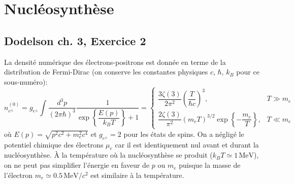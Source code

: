 \documentclass{article}
\numberwithin{equation}{section}
\begin{document}
\section{Nucléosynthèse}
\subsection{Dodelson ch. 3, Exercice 2}
La densité numérique des électrons-positrons est donnée en terme de la distribution 
de Fermi-Dirac (on conserve les constantes physiques $c,\, \hbar,\, k_B$ pour ce 
sous-numéro):
\begin{equation}\label{eq:nelectron} 
        n_{e^\pm}^{(0)} = g_{e^\pm}\int \frac{d^3p}{(2 \pi \hbar)^{3}} 
        \frac{1}{\exp \left\{ \dfrac{E(p)}{k_B T} \right\} + 1} 
        = \left\{ 
\begin{array}{ll}
        \dfrac{3 \zeta(3)}{2\pi^2}\left(\dfrac{T}{\hbar c}  \right)^3, & T \gg m_e \\[3ex]
        \dfrac{2\zeta(3)}{\pi^2}\left( m_e T \right)^{3/2} \exp \left\{ -\dfrac{m_e}{T} \right\}, & T \ll m_e
        
\end{array}
        \right.
\end{equation} 
où $E(p) = \sqrt{p^2 c^2 + m_e^2c^4}$ et $g_{e^\pm} = 2$ pour les états de spins. 
On a négligé le potentiel chimique des électrons $\mu_e$ car il est 
identiquement nul avant et durant la nucléosynthèse.
À la 
température où la nucléosynthèse se produit ($k_BT \simeq 1\, \text{MeV}$), on ne 
peut pas simplifier l'énergie en faveur de $p$ ou $m_e$ puisque la masse de l'électron
$m_e \simeq 0.5\, \text{MeV}/c^2$ est similaire à la température. 
\end{document}
